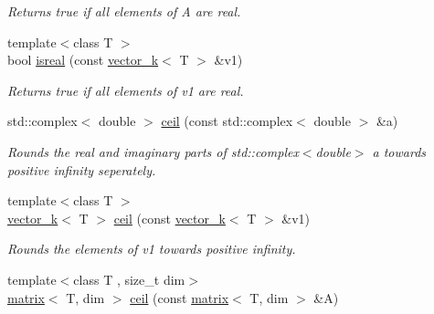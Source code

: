 \begin{DoxyCompactItemize}
\begin{DoxyCompactList}\small\item\em Returns true if all elements of A are real. \end{DoxyCompactList}\item 
\hypertarget{namespacekeycpp_ae5db41667f15caabbbdf37362e2f1990}{{\footnotesize template$<$class T $>$ }\\bool \hyperlink{namespacekeycpp_ae5db41667f15caabbbdf37362e2f1990}{isreal} (const \hyperlink{classkeycpp_1_1vector__k}{vector\-\_\-k}$<$ T $>$ \&v1)}\label{namespacekeycpp_ae5db41667f15caabbbdf37362e2f1990}

\begin{DoxyCompactList}\small\item\em Returns true if all elements of v1 are real. \end{DoxyCompactList}\item 
\hypertarget{namespacekeycpp_a005c1190f7087fb1d2545c38c080fd1a}{std\-::complex$<$ double $>$ \hyperlink{namespacekeycpp_a005c1190f7087fb1d2545c38c080fd1a}{ceil} (const std\-::complex$<$ double $>$ \&a)}\label{namespacekeycpp_a005c1190f7087fb1d2545c38c080fd1a}

\begin{DoxyCompactList}\small\item\em Rounds the real and imaginary parts of std\-::complex$<$double$>$ a towards positive infinity seperately. \end{DoxyCompactList}\item 
\hypertarget{namespacekeycpp_abc86c63af2d6788c45ac99a1f3b14ad8}{{\footnotesize template$<$class T $>$ }\\\hyperlink{classkeycpp_1_1vector__k}{vector\-\_\-k}$<$ T $>$ \hyperlink{namespacekeycpp_abc86c63af2d6788c45ac99a1f3b14ad8}{ceil} (const \hyperlink{classkeycpp_1_1vector__k}{vector\-\_\-k}$<$ T $>$ \&v1)}\label{namespacekeycpp_abc86c63af2d6788c45ac99a1f3b14ad8}

\begin{DoxyCompactList}\small\item\em Rounds the elements of v1 towards positive infinity. \end{DoxyCompactList}\item 
\hypertarget{namespacekeycpp_a6f75eb747c57c3e5ff91323f65a02b5f}{{\footnotesize template$<$class T , size\-\_\-t dim$>$ }\\\hyperlink{classkeycpp_1_1matrix}{matrix}$<$ T, dim $>$ \hyperlink{namespacekeycpp_a6f75eb747c57c3e5ff91323f65a02b5f}{ceil} (const \hyperlink{classkeycpp_1_1matrix}{matrix}$<$ T, dim $>$ \&A)}\label{namespacekeycpp_a6f75eb747c57c3e5ff91323f65a02b5f}


\end{DoxyCompactItemize}
